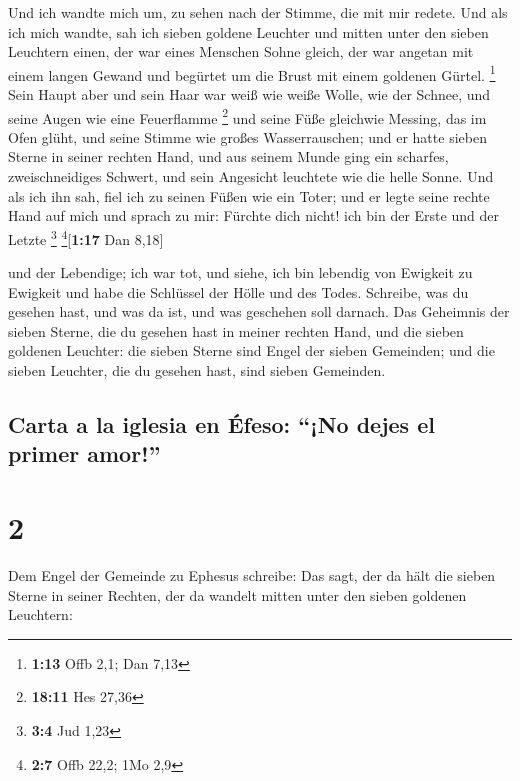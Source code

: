  Und ich wandte mich um, zu sehen nach der Stimme, die
mit mir redete. Und als ich mich wandte, sah ich sieben goldene Leuchter
 und mitten unter den sieben Leuchtern einen, der war
eines Menschen Sohne gleich, der war angetan mit einem langen Gewand und
begürtet um die Brust mit einem goldenen Gürtel. \footnote{\textbf{1:13}
  Offb 2,1; Dan 7,13}  Sein Haupt aber und sein Haar war
weiß wie weiße Wolle, wie der Schnee, und seine Augen wie eine
Feuerflamme \footnote{\textbf{18:11} Hes 27,36}  und
seine Füße gleichwie Messing, das im Ofen glüht, und seine Stimme wie
großes Wasserrauschen;  und er hatte sieben Sterne in
seiner rechten Hand, und aus seinem Munde ging ein scharfes,
zweischneidiges Schwert, und sein Angesicht leuchtete wie die helle
Sonne.  Und als ich ihn sah, fiel ich zu seinen Füßen wie
ein Toter; und er legte seine rechte Hand auf mich und sprach zu mir:
Fürchte dich nicht! ich bin der Erste und der Letzte \footnote{\textbf{3:4}
  Jud 1,23} \footnote{\textbf{2:7} Offb 22,2; 1Mo 2,9}{[}\textbf{1:17}
Dan 8,18{]}

 und der Lebendige; ich war tot, und siehe, ich bin
lebendig von Ewigkeit zu Ewigkeit und habe die Schlüssel der Hölle und
des Todes.  Schreibe, was du gesehen hast, und was da
ist, und was geschehen soll darnach.  Das Geheimnis der
sieben Sterne, die du gesehen hast in meiner rechten Hand, und die
sieben goldenen Leuchter: die sieben Sterne sind Engel der sieben
Gemeinden; und die sieben Leuchter, die du gesehen hast, sind sieben
Gemeinden.

\hypertarget{carta-a-la-iglesia-en-uxe9feso-no-dejes-el-primer-amor}{%
\subsection{Carta a la iglesia en Éfeso: ``¡No dejes el primer
amor!''}\label{carta-a-la-iglesia-en-uxe9feso-no-dejes-el-primer-amor}}

\hypertarget{section-1}{%
\section{2}\label{section-1}}

 Dem Engel der Gemeinde zu Ephesus schreibe: Das sagt, der
da hält die sieben Sterne in seiner Rechten, der da wandelt mitten unter
den sieben goldenen Leuchtern:

